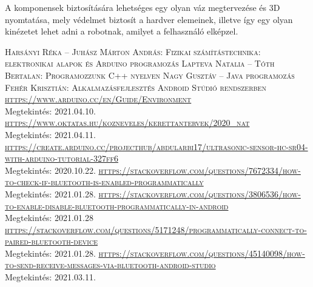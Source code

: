 \documentclass[]{thesis-ekf}
\theoremstyle{definition}
\begin{document}
A komponensek biztosítására lehetséges egy olyan váz megtervezése és 3D nyomtatása, mely védelmet biztosít a hardver elemeinek, illetve így egy olyan kinézetet lehet adni a robotnak, amilyet a felhasználó elképzel.
\begin{thebibliography}{1}
	 \textsc{Harsányi Réka -- Juhász Márton András: Fizikai számítástechnika: elektronikai alapok és Arduino programozás}
	 \textsc{Lapteva Natalia -- Tóth Bertalan: Programozzunk C++ nyelven}
	 \textsc{Nagy Gusztáv -- Java programozás}
		\textsc{Fehér Krisztián: Alkalmazásfejlesztés Android Stúdió rendszerben}
	 \textsc{\url{https://www.arduino.cc/en/Guide/Environment}}\\Megtekintés: 2021.04.10.
	 \textsc{\url{https://www.oktatas.hu/kozneveles/kerettantervek/2020\_nat}}\\Megtekintés: 2021.04.11.
	\textsc{\url{https://create.arduino.cc/projecthub/abdularbi17/ultrasonic-sensor-hc-sr04-with-arduino-tutorial-327ff6}}\\Megtekintés: 2020.10.22.
	\textsc{\url{https://stackoverflow.com/questions/7672334/how-to-check-if-bluetooth-is-enabled-programmatically}}\\Megtekintés: 2021.01.28.
	\textsc{\url{https://stackoverflow.com/questions/3806536/how-to-enable-disable-bluetooth-programmatically-in-android}}\\Megtekintés: 2021.01.28
	\textsc{\url{https://stackoverflow.com/questions/5171248/programmatically-connect-to-paired-bluetooth-device}}\\Megtekintés: 2021.01.28.
	\textsc{\url{https://stackoverflow.com/questions/45140098/how-to-send-receive-messages-via-bluetooth-android-studio}}\\Megtekintés: 2021.03.11.
\end{thebibliography}
\end{document}
